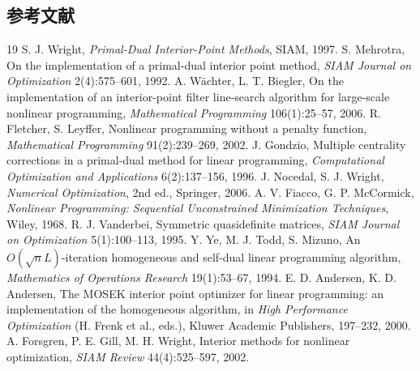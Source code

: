 \subsection{参考文献}

\begin{thebibliography}{19}\small
{}
S. J. Wright, \emph{Primal-Dual Interior-Point Methods}, SIAM, 1997.
S. Mehrotra, On the implementation of a primal-dual interior point method,
\emph{SIAM Journal on Optimization} 2(4):575--601, 1992.
A. W\"achter, L. T. Biegler, On the implementation of an interior-point
filter line-search algorithm for large-scale nonlinear programming,
\emph{Mathematical Programming} 106(1):25--57, 2006.
R. Fletcher, S. Leyffer, Nonlinear programming without a penalty function,
\emph{Mathematical Programming} 91(2):239--269, 2002.
J. Gondzio, Multiple centrality corrections in a primal-dual method for
linear programming, \emph{Computational Optimization and Applications}
6(2):137--156, 1996.
J. Nocedal, S. J. Wright, \emph{Numerical Optimization}, 2nd ed., Springer,
2006.
A. V. Fiacco, G. P. McCormick, \emph{Nonlinear Programming: Sequential
Unconstrained Minimization Techniques}, Wiley, 1968.
R. J. Vanderbei, Symmetric quasidefinite matrices,
\emph{SIAM Journal on Optimization} 5(1):100--113, 1995.
Y. Ye, M. J. Todd, S. Mizuno, An $O(\sqrt{n}L)$-iteration homogeneous and
self-dual linear programming algorithm,
\emph{Mathematics of Operations Research} 19(1):53--67, 1994.
E. D. Andersen, K. D. Andersen, The MOSEK interior point optimizer for
linear programming: an implementation of the homogeneous algorithm, in
\emph{High Performance Optimization} (H. Frenk et al., eds.), Kluwer
Academic Publishers, 197--232, 2000.
A. Forsgren, P. E. Gill, M. H. Wright, Interior methods for nonlinear
optimization, \emph{SIAM Review} 44(4):525--597, 2002.
\end{thebibliography}
